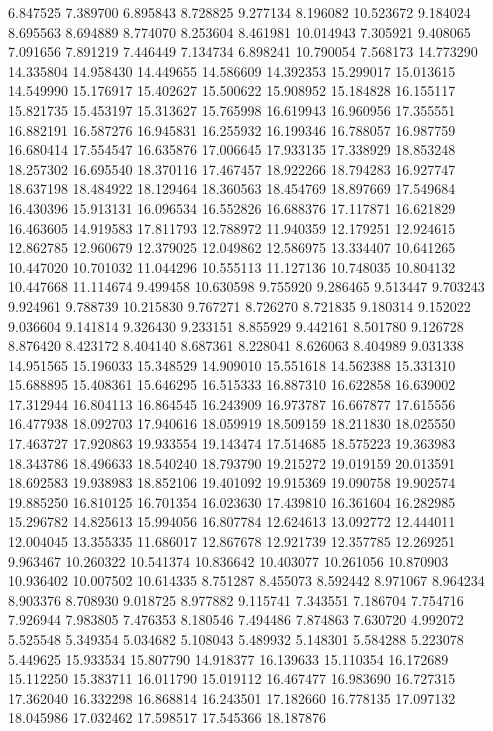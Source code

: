 6.847525
7.389700
6.895843
8.728825
9.277134
8.196082
10.523672
9.184024
8.695563
8.694889
8.774070
8.253604
8.461981
10.014943
7.305921
9.408065
7.091656
7.891219
7.446449
7.134734
6.898241
10.790054
7.568173
14.773290
14.335804
14.958430
14.449655
14.586609
14.392353
15.299017
15.013615
14.549990
15.176917
15.402627
15.500622
15.908952
15.184828
16.155117
15.821735
15.453197
15.313627
15.765998
16.619943
16.960956
17.355551
16.882191
16.587276
16.945831
16.255932
16.199346
16.788057
16.987759
16.680414
17.554547
16.635876
17.006645
17.933135
17.338929
18.853248
18.257302
16.695540
18.370116
17.467457
18.922266
18.794283
16.927747
18.637198
18.484922
18.129464
18.360563
18.454769
18.897669
17.549684
16.430396
15.913131
16.096534
16.552826
16.688376
17.117871
16.621829
16.463605
14.919583
17.811793
12.788972
11.940359
12.179251
12.924615
12.862785
12.960679
12.379025
12.049862
12.586975
13.334407
10.641265
10.447020
10.701032
11.044296
10.555113
11.127136
10.748035
10.804132
10.447668
11.114674
9.499458
10.630598
9.755920
9.286465
9.513447
9.703243
9.924961
9.788739
10.215830
9.767271
8.726270
8.721835
9.180314
9.152022
9.036604
9.141814
9.326430
9.233151
8.855929
9.442161
8.501780
9.126728
8.876420
8.423172
8.404140
8.687361
8.228041
8.626063
8.404989
9.031338
14.951565
15.196033
15.348529
14.909010
15.551618
14.562388
15.331310
15.688895
15.408361
15.646295
16.515333
16.887310
16.622858
16.639002
17.312944
16.804113
16.864545
16.243909
16.973787
16.667877
17.615556
16.477938
18.092703
17.940616
18.059919
18.509159
18.211830
18.025550
17.463727
17.920863
19.933554
19.143474
17.514685
18.575223
19.363983
18.343786
18.496633
18.540240
18.793790
19.215272
19.019159
20.013591
18.692583
19.938983
18.852106
19.401092
19.915369
19.090758
19.902574
19.885250
16.810125
16.701354
16.023630
17.439810
16.361604
16.282985
15.296782
14.825613
15.994056
16.807784
12.624613
13.092772
12.444011
12.004045
13.355335
11.686017
12.867678
12.921739
12.357785
12.269251
9.963467
10.260322
10.541374
10.836642
10.403077
10.261056
10.870903
10.936402
10.007502
10.614335
8.751287
8.455073
8.592442
8.971067
8.964234
8.903376
8.708930
9.018725
8.977882
9.115741
7.343551
7.186704
7.754716
7.926944
7.983805
7.476353
8.180546
7.494486
7.874863
7.630720
4.992072
5.525548
5.349354
5.034682
5.108043
5.489932
5.148301
5.584288
5.223078
5.449625
15.933534
15.807790
14.918377
16.139633
15.110354
16.172689
15.112250
15.383711
16.011790
15.019112
16.467477
16.983690
16.727315
17.362040
16.332298
16.868814
16.243501
17.182660
16.778135
17.097132
18.045986
17.032462
17.598517
17.545366
18.187876
